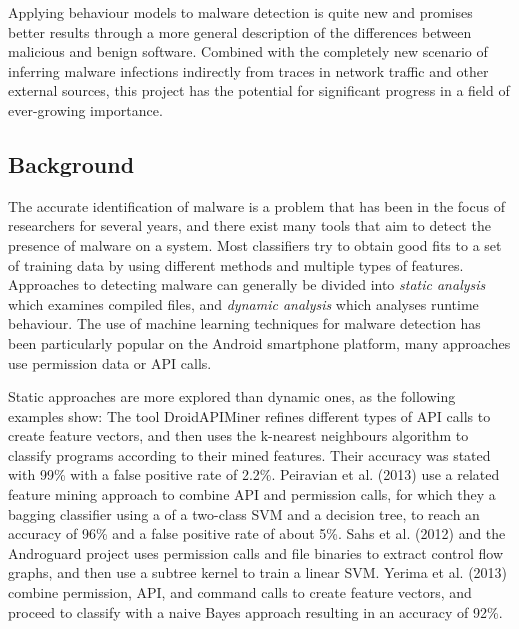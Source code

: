 \documentclass[a4paper,12pt,twoside]{report}
\begin{document}
Applying  behaviour models to malware detection is quite new and promises better results through a more general description of the differences between malicious and benign software. Combined with the completely new scenario of inferring malware infections indirectly from traces in network traffic and other external sources, this project has the potential for significant progress in a field of ever-growing importance.

\subsection{Background}

The accurate identification of malware is a problem that has been in the focus of researchers for several years, and there exist many tools that aim to detect  the presence of malware on a system. Most classifiers   try  to  obtain  good  fits  to a set of training data  by using different methods and multiple types of features. Approaches to detecting malware can generally be divided into \textit{static analysis} which examines compiled files, and \textit{dynamic analysis} which analyses runtime behaviour. The use of machine learning techniques for malware detection has been particularly popular on the Android smartphone platform, many approaches use permission data or API calls. 


Static approaches are more explored than dynamic ones, as the following examples show: The tool DroidAPIMiner \cite{aafer2013droidapiminer} refines different types of API calls  to create feature vectors, and then uses the k-nearest neighbours algorithm to classify programs according to their mined features. Their accuracy was stated with 99\% with a false positive rate of 2.2\%. Peiravian et al. (2013) \cite{peiravian2013machine} use a related feature mining approach to combine API and permission calls, for which they a bagging classifier using a of a two-class SVM and a decision tree, to reach an accuracy of 96\% and a false positive rate of about 5\%. Sahs et al. (2012) \cite{sahs2012machine} and the Androguard project uses permission calls and file binaries to extract control flow graphs, and then use a subtree kernel to train a linear SVM. Yerima et al. (2013) \cite{yerima2013new} combine permission, API, and command calls to create feature vectors, and proceed to classify with a naive Bayes approach resulting in an accuracy of 92\%. 
\end{document}
